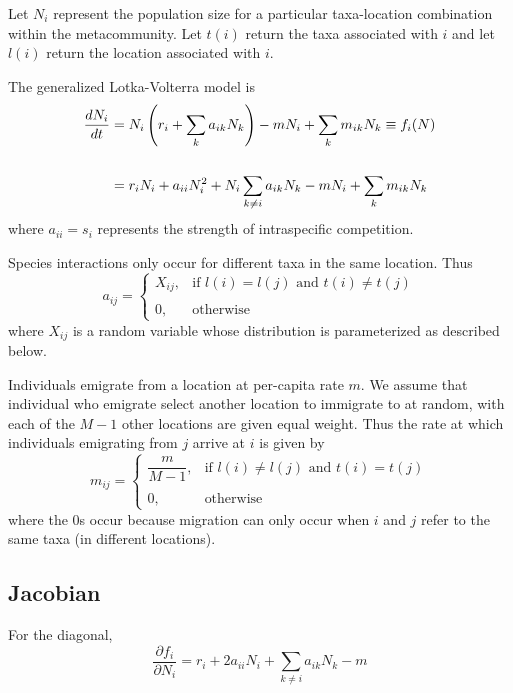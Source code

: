 \documentclass{article}
\begin{document}
Let $N_i$ represent the population size for a particular taxa-location combination within the metacommunity. Let $t(i)$ return the taxa associated with $i$ and let $l(i)$ return the location associated with $i$.

The generalized Lotka-Volterra model is
\begin{align}
\dfrac{dN_i}{dt} 
&= N_i\left(r_i+\sum_k a_{ik}N_k\right)-mN_i+\sum_k m_{ik}N_k \equiv f_i(N) \\
\notag\\
&=r_iN_i + a_{ii}N_i^2 + N_i\sum_{k\neq i} a_{ik}N_k - mN_i + \sum_k m_{ik} N_k
\end{align}
where $a_{ii} = s_i$ represents the strength of intraspecific competition.

Species interactions only occur for different taxa in the same location. Thus
\begin{equation}
    a_{ij} = 
    \left\{
        \begin{array}{ll}
            X_{ij}, & \text{if } l(i) = l(j) \text{ and } t(i) \neq t(j)\\
            \\
            0, & \text{otherwise}
            \end{array}
            \right.
\end{equation}
where $X_{ij}$ is a random variable whose distribution is parameterized as described below.

Individuals emigrate from a location at per-capita rate $m$. We assume that individual who emigrate select another location to immigrate to at random, with each of the $M-1$ other locations are given equal weight. Thus the rate at which individuals emigrating from $j$ arrive at $i$ is given by
\begin{equation}
    m_{ij} = 
    \left\{
        \begin{array}{ll}
            \dfrac{m}{M-1}, & \text{if } l(i) \neq l(j) \text{ and } t(i) = t(j) \\
            \\
            0, & \text{otherwise}
        \end{array}
        \right.
\end{equation}
where the 0s occur because migration can only occur when $i$ and $j$ refer to the same taxa (in different locations).

\subsection*{Jacobian}
For the diagonal,
\begin{equation}
\dfrac{\partial f_i}{\partial N_i} = r_i + 2a_{ii}N_i + \sum_{k \neq i} a_{ik}N_k - m 
\end{equation}
\end{document}
